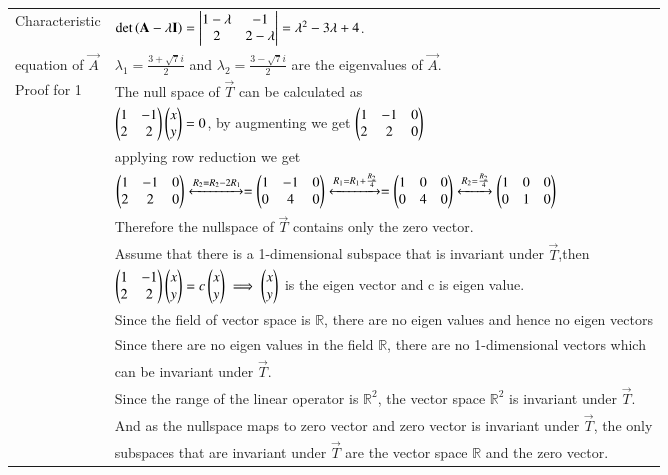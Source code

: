 \documentclass[journal,12pt]{IEEEtran}
\begin{document}
\begin{longtable}{|l|l|}
    \hline
    Characteristic & \qquad  \qquad \qquad \qquad $\det \left(\mathbf{A}-\lambda \mathbf{I}\right)=\begin{vmatrix}1-\lambda&-1\\2&2-\lambda\end{vmatrix}=\lambda^2-3\lambda+4$.\\
    equation of $\vec{A}$&\qquad  \qquad \qquad \qquad $\lambda_1=\frac{3+\sqrt{7}i}{2}$ and $\lambda_2=\frac{3-\sqrt{7}i}{2}$ are the eigenvalues of $\vec{A}$.\\
    \hline
    Proof for 1  & The null space of $\vec{T}$ can be calculated as\\
   & $\begin{pmatrix}1&-1\\2&2\end{pmatrix}\begin{pmatrix}x\\y\end{pmatrix}=0$, by augmenting we get $\begin{pmatrix}1&-1&0\\2&2&0\end{pmatrix}$ \\
   & applying row reduction we get\\
   & $\begin{pmatrix}1&-1&0\\2&2&0\end{pmatrix}\xleftrightarrow{R_2=R_2-2R_1}=\begin{pmatrix}1&-1&0\\0&4&0\end{pmatrix}\xleftrightarrow{R_1=R_1+\frac{R_2}{4}}=\begin{pmatrix}1&0&0\\0&4&0\end{pmatrix}\xleftrightarrow{R_2=\frac{R_2}{4}}\begin{pmatrix}1&0&0\\0&1&0\end{pmatrix}$\\
   & Therefore the nullspace of $\vec{T}$ contains only the zero vector.\\
   &Assume that there is a 1-dimensional subspace that is invariant under $\vec{T}$,then \\
   & $\begin{pmatrix}1&-1\\2&2\end{pmatrix}\begin{pmatrix}x\\y\end{pmatrix}=c\begin{pmatrix}x\\y\end{pmatrix}\implies\begin{pmatrix}x\\y\end{pmatrix}$ is the eigen vector and c is eigen value.\\
   & Since the field of vector space is $\mathbb{R}$, there are no eigen values and hence no eigen vectors\\
   & Since there are no eigen values in the field $\mathbb{R}$, there are no 1-dimensional vectors which\\
   &can be invariant under $\vec{T}$.\\
   &Since the range of the linear operator is $\mathbb{R}^2$, the vector space $\mathbb{R}^2$ is invariant under $\vec{T}$.\\
   &And as the nullspace maps to zero vector and zero vector is invariant under $\vec{T}$, the only \\
   &subspaces that are invariant under $\vec{T}$ are the vector space $\mathbb{R}$ and the zero vector.\\

\end{longtable}
\end{document}
